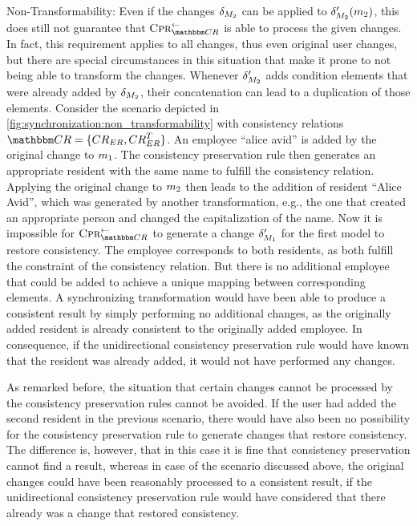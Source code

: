 \begin{properdescription}
    \item[Non-Transformability:] Even if the changes $\change{\metamodel{M}{2}}$ can be applied to $\change{\metamodel{M}{2}}'(\model{m}{2})$, this does still not guarantee that $\consistencypreservationrule{\consistencyrelationset{CR}}^{\leftarrow}$ is able to process the given changes.
    In fact, this requirement applies to all changes, thus even original user changes, but there are special circumstances in this situation that make it prone to not being able to transform the changes.
    Whenever $\change{\metamodel{M}{2}}'$ adds condition elements that were already added by $\change{\metamodel{M}{2}}$, their concatenation can lead to a duplication of those elements.
    Consider the scenario depicted in \autoref{fig:synchronization:non_transformability} with consistency relations $\consistencyrelationset{CR} = \setted{\consistencyrelation{CR}{ER}, \consistencyrelation{CR}{ER}^T}$. 
    An employee \enquote{alice avid} is added by the original change to $\model{m}{1}$.
    The consistency preservation rule then generates an appropriate resident with the same name to fulfill the consistency relation.
    Applying the original change to $\model{m}{2}$ then leads to the addition of resident \enquote{Alice Avid}, which was generated by another transformation, e.g., the one that created an appropriate person and changed the capitalization of the name.
    Now it is impossible for $\consistencypreservationrule{\consistencyrelationset{CR}}^{\leftarrow}$ to generate a change $\change{\metamodel{M}{1}}'$ for the first model to restore consistency. The employee corresponds to both residents, as both fulfill the constraint of the consistency relation. 
    But there is no additional employee that could be added to achieve a unique mapping between corresponding elements.
    A synchronizing transformation would have been able to produce a consistent result by simply performing no additional changes, as the originally added resident is already consistent to the originally added employee.
    In consequence, if the unidirectional consistency preservation rule would have known that the resident was already added, it would not have performed any changes.
\end{properdescription}

As remarked before, the situation that certain changes cannot be processed by the consistency preservation rules cannot be avoided. 
If the user had added the second resident in the previous scenario, there would have also been no possibility for the consistency preservation rule to generate changes that restore consistency.
The difference is, however, that in this case it is fine that consistency preservation cannot find a result, whereas in case of the scenario discussed above, the original changes could have been reasonably processed to a consistent result, if the unidirectional consistency preservation rule would have considered that there already was a change that restored consistency.

